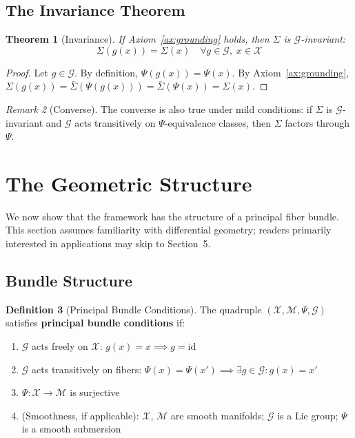 \documentclass[12pt]{article}
\newtheorem{theorem}{Theorem}[section]
\theoremstyle{definition}
\newtheorem{definition}[theorem]{Definition}
\theoremstyle{remark}
\newtheorem{remark}[theorem]{Remark}
\newcommand{\calX}{\mathcal{X}}
\newcommand{\calM}{\mathcal{M}}
\newcommand{\calG}{\mathcal{G}}
\newcommand{\Sigmabar}{\bar{\Sigma}}
\begin{document}
\subsection{The Invariance Theorem}

\begin{theorem}[Invariance]\label{thm:invariance}
If Axiom~\ref{ax:grounding} holds, then $\Sigma$ is $\calG$-invariant:
\[
    \Sigma(g(x)) = \Sigma(x) \quad \forall g \in \calG,\; x \in \calX
\]
\end{theorem}

\begin{proof}
Let $g \in \calG$. By definition, $\Psi(g(x)) = \Psi(x)$. By Axiom~\ref{ax:grounding}, $\Sigma(g(x)) = \Sigmabar(\Psi(g(x))) =
\Sigmabar(\Psi(x)) = \Sigma(x)$.
\end{proof}

\begin{remark}[Converse]\label{rem:converse}
The converse is also true under mild conditions: if $\Sigma$ is $\calG$-invariant
and $\calG$ acts transitively on $\Psi$-equivalence classes, then $\Sigma$ factors through $\Psi$.
\end{remark}

\section{The Geometric Structure}

We now show that the framework has the structure of a principal fiber bundle. This section
assumes familiarity with differential geometry; readers primarily interested in applications may
skip to Section~5.

\subsection{Bundle Structure}

\begin{definition}[Principal Bundle Conditions]\label{def:bundle-cond}
The quadruple $(\calX, \calM, \Psi, \calG)$ satisfies \textbf{principal
bundle conditions} if:
\end{definition}

\begin{enumerate}[label=(PB\arabic*)]
    \item $\calG$ acts freely on $\calX$: $g(x) = x \implies g = \mathrm{id}$
    \item $\calG$ acts transitively on fibers: $\Psi(x) = \Psi(x') \implies \exists g \in \calG : g(x) = x'$
    \item $\Psi : \calX \to \calM$ is surjective
    \item (Smoothness, if applicable): $\calX$, $\calM$ are smooth manifolds; $\calG$ is a Lie group; $\Psi$ is a smooth submersion
\end{enumerate}
\end{document}
